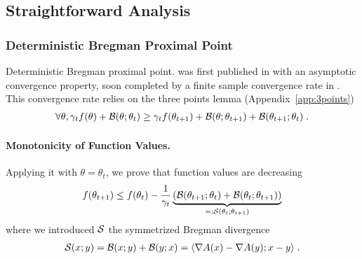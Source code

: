 \documentclass{article}
\newcommand{\natp}{\theta}
\newcommand{\lr}{\gamma} %
\begin{document}
\subsection{Straightforward Analysis}

\subsubsection{Deterministic Bregman Proximal Point}
Deterministic Bregman proximal point. was first published in \citet{eckstein1993nonlinear} with an asymptotic convergence property, soon completed by a finite sample convergence rate in \citet{chen1993convergence}. 
This convergence rate relies on the three points lemma (Appendix~\ref{app:3points})
\begin{align}
	 \forall \natp, \lr_t f(\natp) + \cB(\natp ; \natp_t) \geq \lr_t f(\natp_{t+1}) + \cB( \natp; \natp_{t+1}) +\cB(\natp_{t+1} ; \natp_{t}) \; .
\end{align}

\paragraph{Monotonicity of Function Values.}
Applying it with $\natp=\natp_t$, we prove that function values are decreasing
\begin{align}
	f(\natp_{t+1})  \leq f(\natp_{t})  - \inv{\lr_t} \underbrace{\left (\cB(\natp_{t+1} ; \natp_{t}) + \cB(\natp_{t} ; \natp_{t+1}) \right) }_{=: \cS(\natp_{t} ; \natp_{t+1})}
\end{align}
where we introduced ${\mathcal S}$ the symmetrized Bregman divergence
\begin{align}
	{\mathcal S}(x; y) = {\mathcal B}(x ; y) + {\mathcal B}(y ; x) = \langle\nabla A(x) - \nabla A(y) ; x-y \rangle \; .
\end{align}
\end{document}
